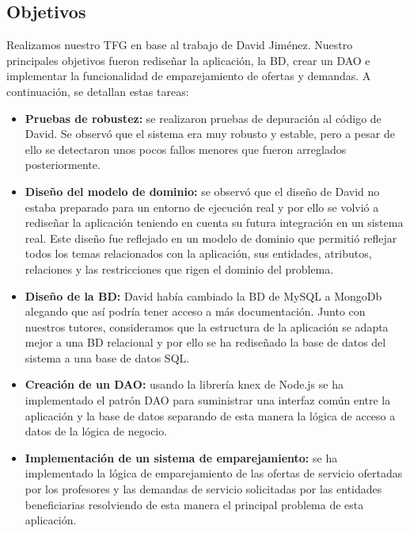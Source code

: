 \documentclass{article}
\begin{document}
\subsection{Objetivos}
Realizamos nuestro TFG en base al trabajo de David Jiménez.
Nuestro principales objetivos fueron rediseñar la aplicación, la BD, crear un DAO e implementar la funcionalidad de emparejamiento de ofertas y demandas.
A continuación, se detallan estas tareas:
\begin{itemize}
\item \textbf{Pruebas de robustez:} se realizaron pruebas de depuración al código de David. Se observó que el sistema era muy robusto y estable, pero a pesar de ello se detectaron unos pocos fallos menores que fueron arreglados posteriormente.
\item \textbf{Diseño del modelo de dominio:} se observó que el diseño de David no estaba preparado para un entorno de ejecución real y por ello se volvió a rediseñar la aplicación teniendo en cuenta su futura integración en un sistema real. Este diseño fue reflejado en un modelo de dominio que permitió reflejar todos los temas relacionados con la aplicación, sus entidades, atributos, relaciones y las restricciones que rigen el dominio del problema.
\item \textbf{Diseño de la BD:} David había cambiado la BD de MySQL a MongoDb alegando que así podría tener acceso a más documentación. Junto con nuestros tutores, consideramos que la estructura de la aplicación se adapta mejor a una BD relacional y por ello se ha rediseñado la base de datos del sistema a una base de datos SQL.
\item \textbf{Creación de un DAO:} usando la librería knex de Node.js se ha implementado el patrón DAO para suministrar una interfaz común entre la aplicación y la base de datos separando de esta manera la lógica de acceso a datos de la lógica de negocio.
\item \textbf{Implementación de un sistema de emparejamiento:} se ha implementado la lógica de emparejamiento de las ofertas de servicio ofertadas por los profesores y las demandas de servicio solicitadas por las entidades beneficiarias resolviendo de esta manera el principal problema de esta aplicación.
\end{itemize}




\end{document}
